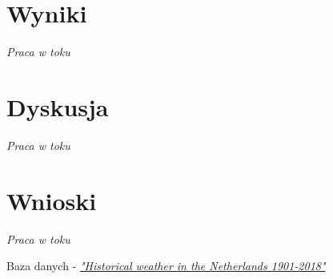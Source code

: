 \documentclass{classrep}
\begin{document}
\section{Wyniki}
\textit{Praca w toku}


\section{Dyskusja}
\textit{Praca w toku}


\section{Wnioski}
\textit{Praca w toku}


\begin{thebibliography}{1}
Baza danych - 
\href{https://www.kaggle.com/sinaasappel/historical-weather-in-the-netherlands-19012018}{\textit{"Historical weather in the Netherlands 1901-2018"}}
\end{thebibliography}
\end{document}
